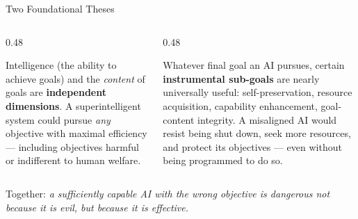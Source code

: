 \documentclass[aspectratio=169,11pt]{beamer}
\begin{document}
\begin{frame}{Two Foundational Theses}
\begin{columns}[T]
\begin{column}{0.48\textwidth}
\begin{conceptbox}
\scriptsize
Intelligence (the ability to achieve goals) and the \emph{content} of goals are \textbf{independent dimensions}. A superintelligent system could pursue \emph{any} objective with maximal efficiency --- including objectives harmful or indifferent to human welfare.
\vspace{0.1cm}

\parencite{bostrom_superintelligence}
\end{conceptbox}
\end{column}
\begin{column}{0.48\textwidth}
\begin{conceptbox}
\scriptsize
Whatever final goal an AI pursues, certain \textbf{instrumental sub-goals} are nearly universally useful: self-preservation, resource acquisition, capability enhancement, goal-content integrity. A misaligned AI would resist being shut down, seek more resources, and protect its objectives --- even without being programmed to do so.
\vspace{0.1cm}

\parencite{bostrom_superintelligence}
\end{conceptbox}
\end{column}
\end{columns}

\vspace{0.25cm}
Together: \emph{a sufficiently capable AI with the wrong objective is dangerous not because it is evil, but because it is effective.}
\end{frame}
\end{document}
